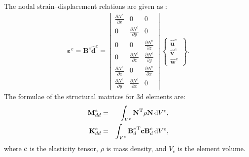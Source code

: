 The nodal strain--displacement relations are given as \cite{kudela20093d}:
\begin{eqnarray}
	\boldsymbol{\varepsilon}^e=\textbf{B}^e\widehat{\textbf{d}}^e=
	\left [
	\begin{array}{ccc}
		\frac{\partial N^e}{\partial x} & 0 & 0\\
		0 & \frac{\partial N^e}{\partial y} & 0\\
		0 & 0 & \frac{\partial N^e}{\partial z}\\
		0 & \frac{\partial N^e}{\partial z} & \frac{\partial N^e}{\partial y}\\
		\frac{\partial N^e}{\partial z} & 0 & \frac{\partial N^e}{\partial x}\\
		\frac{\partial N^e}{\partial y} & \frac{\partial N^e}{\partial x} & 0
	\end{array} \right]
	\left \{ \begin{array}{c}
		\widehat{\textbf{u}}^e \\
		\widehat{\textbf{v}}^e \\
		\widehat{\textbf{w}}^e
	\end{array} \right\}.
\end{eqnarray}
The formulae of the structural matrices for \ac{3d} elements are:
\begin{eqnarray}
	\textbf{M}_{dd}^e & = & \int_{V^e}\textbf{N}^{\mathrm{T}}\rho \textbf{N} \mathop{}\!\mathrm{d} V^e,\\
	\textbf{K}_{dd}^e & = & \int_{V^e}{\textbf{B}_d^e}^{\mathrm{T}}\textbf{c}\textbf{B}_d^e \mathop{}\!\mathrm{d} V^e,
\end{eqnarray}
%
where \textbf{c} is the elasticity tensor, \(\rho\) is mass density, and \(V_e\) is the element volume.